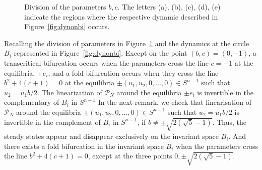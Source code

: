 \documentclass{article}
\theoremstyle{definition}
\begin{document}
\begin{figure}[ht]
\centering
{}
\caption{Division of the parameters $b,c$. The letters (a), (b), (c), (d), (e) indicate the regions where the respective dynamic described in Figure~\ref{fig:dynonbi} occurs.}
\label{fig:divbcBi}
\end{figure}



Recalling the division of parameters in Figure~\ref{fig:divbcBi} and the dynamics at the circle $B_i$ represented in Figure~\ref{fig:dynonbi}. Except on the point $(b,c)=(0,-1)$, a transcritical bifurcation occurs when the parameters cross the line $c=-1$ at the equilibria, $\pm e_i$, and a fold bifurcation occurs when they cross the line $b^2+4(c+1)=0$ at the equilibria $\pm(u_1,u_2,0,\dots,0)\in S^{n-1}$ such that $u_2=u_1 b/2$.
The linearization of $\mathcal{P}_N$ around the equilibria $\pm e_i$ is invertible in the complementary of $B_i$ in $S^{n-1}$
In the next remark, we check that linearisation of $\mathcal{P}_N$ around the equilibria $\pm(u_1,u_2,0,\dots,0)\in S^{n-1}$ such that $u_2=u_1 b/2$ is invertible in the complement of $B_i$ in $S^{n-1}$, if $b\neq \pm \sqrt{2 \left(\sqrt{5}-1\right)}$.
Thus, the steady states appear and disappear exclusively on the invariant space $B_i$.
And there exists a fold bifurcation in the invariant space $B_i$ when the parameters cross the line $b^2+4(c+1)=0$, except at the three points $0,\pm \sqrt{2 \left(\sqrt{5}-1\right)}$.
\end{document}
